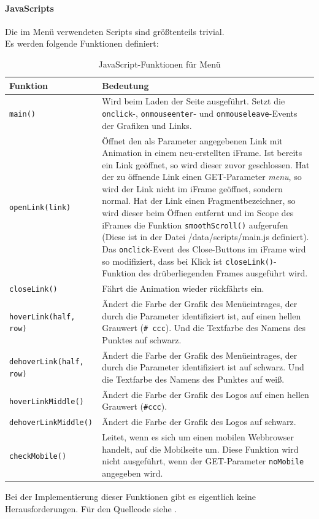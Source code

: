\paragraph{JavaScripts\\}
Die im Menü verwendeten Scripts sind größtenteils trivial.\\
Es werden folgende Funktionen definiert:
\begin{table}[H]
\centering
\begin{tabular}{p{3.5 cm}p{11 cm}}
	\toprule
		\textbf{Funktion} & \textbf{Bedeutung} \\
	\midrule
		\texttt{main()} & Wird beim Laden der Seite ausgeführt. Setzt die \texttt{onclick}-, \texttt{onmouseenter}- und \texttt{onmouseleave}-Events der Grafiken und Links.\\
		\hline
		\texttt{openLink(link)} & Öffnet den als Parameter angegebenen Link mit Animation in einem neu-erstellten iFrame. Ist bereits ein Link geöffnet, so wird dieser zuvor geschlossen. Hat der zu öffnende Link einen GET-Parameter \textit{menu}, so wird der Link nicht im iFrame geöffnet, sondern normal. Hat der Link einen Fragmentbezeichner, so wird dieser beim Öffnen entfernt und im Scope des iFrames die Funktion \texttt{smoothScroll()} aufgerufen (Diese ist in der Datei /data/scripts/main.js definiert). Das \texttt{onclick}-Event des Close-Buttons im iFrame wird so modifiziert, dass bei Klick ist \texttt{closeLink()}-Funktion des drüberliegenden Frames ausgeführt wird.\\
		\hline
		\texttt{closeLink()} & Fährt die Animation wieder rückfährts ein.\\
		\hline
		\texttt{hoverLink(half, row)} & Ändert die Farbe der Grafik des Menüeintrages, der durch die Parameter identifiziert ist, auf einen hellen Grauwert (\texttt{\# ccc}). Und die Textfarbe des Namens des Punktes auf schwarz.\\
		\hline
		\texttt{dehoverLink(half, row)} & Ändert die Farbe der Grafik des Menüeintrages, der durch die Parameter identifiziert ist auf schwarz. Und die Textfarbe des Namens des Punktes auf weiß.\\
		\hline
		\texttt{hoverLinkMiddle()} & Ändert die Farbe der Grafik des Logos auf einen hellen Grauwert (\texttt{\#ccc}).\\
		\hline
		\texttt{dehoverLinkMiddle()} & Ändert die Farbe der Grafik des Logos auf schwarz.\\
		\hline
		\texttt{checkMobile()} & Leitet, wenn es sich um einen mobilen Webbrowser handelt, auf die Mobilseite um. Diese Funktion wird nicht ausgeführt, wenn der GET-Parameter \texttt{noMobile} angegeben wird.\\
	\bottomrule
\end{tabular}
\caption{JavaScript-Funktionen für Menü}
\label{tab:content_imple_design_menu_script_functions}
\end{table}
Bei der Implementierung dieser Funktionen gibt es eigentlich keine Herausforderungen. Für den Quellcode siehe .

